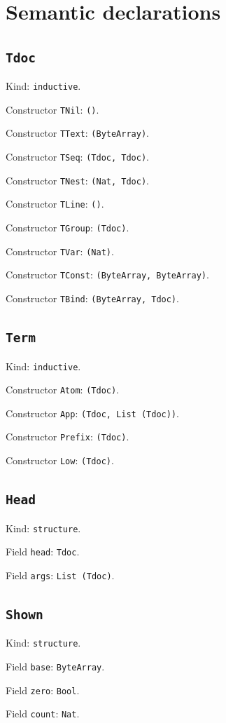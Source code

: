 \documentclass[11pt]{article}
\begin{document}
\section*{Semantic declarations}
\subsection*{\texttt{Tdoc}}
\noindent Kind: \texttt{inductive}.\par
\noindent Constructor \texttt{TNil}: \texttt{()}.\par
\noindent Constructor \texttt{TText}: \texttt{(ByteArray)}.\par
\noindent Constructor \texttt{TSeq}: \texttt{(Tdoc, Tdoc)}.\par
\noindent Constructor \texttt{TNest}: \texttt{(Nat, Tdoc)}.\par
\noindent Constructor \texttt{TLine}: \texttt{()}.\par
\noindent Constructor \texttt{TGroup}: \texttt{(Tdoc)}.\par
\noindent Constructor \texttt{TVar}: \texttt{(Nat)}.\par
\noindent Constructor \texttt{TConst}: \texttt{(ByteArray, ByteArray)}.\par
\noindent Constructor \texttt{TBind}: \texttt{(ByteArray, Tdoc)}.\par
\subsection*{\texttt{Term}}
\noindent Kind: \texttt{inductive}.\par
\noindent Constructor \texttt{Atom}: \texttt{(Tdoc)}.\par
\noindent Constructor \texttt{App}: \texttt{(Tdoc, List (Tdoc))}.\par
\noindent Constructor \texttt{Prefix}: \texttt{(Tdoc)}.\par
\noindent Constructor \texttt{Low}: \texttt{(Tdoc)}.\par
\subsection*{\texttt{Head}}
\noindent Kind: \texttt{structure}.\par
\noindent Field \texttt{head}: \texttt{Tdoc}.\par
\noindent Field \texttt{args}: \texttt{List (Tdoc)}.\par
\subsection*{\texttt{Shown}}
\noindent Kind: \texttt{structure}.\par
\noindent Field \texttt{base}: \texttt{ByteArray}.\par
\noindent Field \texttt{zero}: \texttt{Bool}.\par
\noindent Field \texttt{count}: \texttt{Nat}.\par
\end{document}
